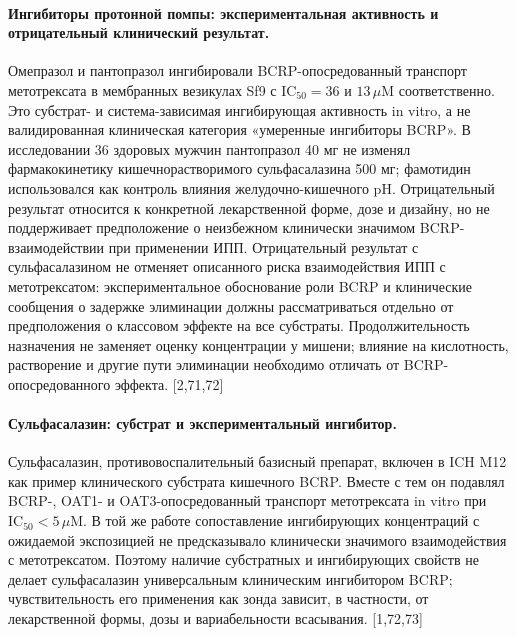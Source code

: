 \documentclass[11pt]{article}
\begin{document}
\paragraph{Ингибиторы протонной помпы: экспериментальная активность и отрицательный клинический результат.}
Омепразол и пантопразол ингибировали BCRP-опосредованный транспорт метотрексата в мембранных везикулах Sf9 с \(\mathrm{IC}_{50}=36\) и \(13\,\mu\mathrm{M}\) соответственно. Это субстрат- и система-зависимая ингибирующая активность in vitro, а не валидированная клиническая категория «умеренные ингибиторы BCRP». В исследовании 36 здоровых мужчин пантопразол 40 мг не изменял фармакокинетику кишечнорастворимого сульфасалазина 500 мг; фамотидин использовался как контроль влияния желудочно-кишечного pH. Отрицательный результат относится к конкретной лекарственной форме, дозе и дизайну, но не поддерживает предположение о неизбежном клинически значимом BCRP-взаимодействии при применении ИПП. Отрицательный результат с сульфасалазином не отменяет описанного риска взаимодействия ИПП с метотрексатом: экспериментальное обоснование роли BCRP и клинические сообщения о задержке элиминации должны рассматриваться отдельно от предположения о классовом эффекте на все субстраты. Продолжительность назначения не заменяет оценку концентрации у мишени; влияние на кислотность, растворение и другие пути элиминации необходимо отличать от BCRP-опосредованного эффекта. [2,71,72]

\paragraph{Сульфасалазин: субстрат и экспериментальный ингибитор.}
Сульфасалазин, противовоспалительный базисный препарат, включен в ICH M12 как пример клинического субстрата кишечного BCRP. Вместе с тем он подавлял BCRP-, OAT1- и OAT3-опосредованный транспорт метотрексата in vitro при \(\mathrm{IC}_{50}<5\,\mu\mathrm{M}\). В той же работе сопоставление ингибирующих концентраций с ожидаемой экспозицией не предсказывало клинически значимого взаимодействия с метотрексатом. Поэтому наличие субстратных и ингибирующих свойств не делает сульфасалазин универсальным клиническим ингибитором BCRP; чувствительность его применения как зонда зависит, в частности, от лекарственной формы, дозы и вариабельности всасывания. [1,72,73]
\end{document}

